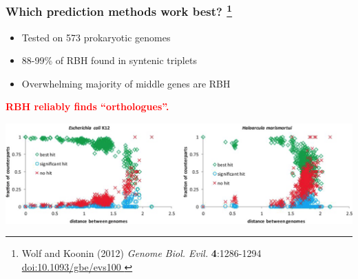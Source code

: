 \begin{frame}
  \frametitle{Which prediction methods work best?
    \footnote{\tiny{Wolf and Koonin (2012) \textit{Genome Biol. Evil.} \textbf{4}:1286-1294 \href{http://dx.doi.org/10.1093/gbe/evs100}{doi:10.1093/gbe/evs100
    }}}
  }
  \begin{itemize}
    \item \textcolor{hutton_green}{Tested on 573 prokaryotic genomes}
    \item \textcolor{hutton_blue}{88-99\% of RBH found in syntenic triplets}
    \item \textcolor{hutton_purple}{Overwhelming majority of middle genes are RBH}
  \end{itemize}
  \textcolor{red}{\textbf{RBH reliably finds ``orthologues''.}}
  \begin{center}
      \includegraphics[width=1\textwidth]{images/syntenic_triplet_results} 
  \end{center}
\end{frame}

